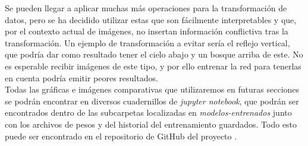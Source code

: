 Se pueden llegar a aplicar muchas más operaciones para la transformación de datos, pero se ha decidido utilizar estas que son fácilmente interpretables y que, por el contexto actual de imágenes, no insertan información conflictiva tras la transformación. Un ejemplo de transformación a evitar sería el reflejo vertical, que podría dar como resultado tener el cielo abajo y un bosque arriba de este. No es esperable recibir imágenes de este tipo, y por ello entrenar la red para tenerlas en cuenta podría emitir peores resultados.\\

Todas las gráficas e imágenes comparativas que utilizaremos en futuras secciones se podrán encontrar en diversos cuadernillos de \emph{jupyter notebook}, que podrán ser encontrados dentro de las subcarpetas localizadas en \emph{modelos-entrenados} junto con los archivos de pesos y del historial del entrenamiento guardados. Todo esto puede ser encontrado en el repositorio de GitHub del proyecto \cite{GitHub}.\\




